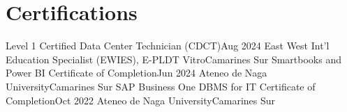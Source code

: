 \section{Certifications}

\resumeSubHeadingListStart
    \resumeSubheading
    {Level 1 Certified Data Center Technician (CDCT)}{Aug 2024}
    {East West Int'l Education Specialist (EWIES), E-PLDT Vitro}{Camarines Sur}
    \resumeSubheading
    {Smartbooks and Power BI Certificate of Completion}{Jun 2024}
    {Ateneo de Naga University}{Camarines Sur}
    \resumeSubheading
    {SAP Business One DBMS for IT Certificate of Completion}{Oct 2022}
    {Ateneo de Naga University}{Camarines Sur}
\resumeSubHeadingListEnd